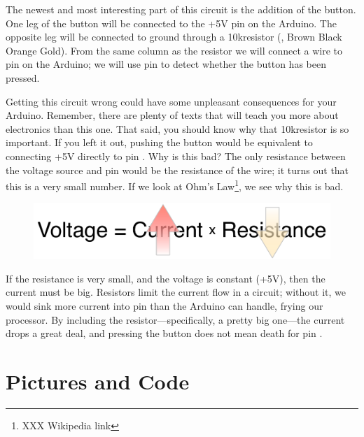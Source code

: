The newest and most interesting part of this circuit is the addition of the button. One leg of the button will be connected to the {\code +5V} pin on the Arduino. The opposite leg will be connected to ground through a 10k\ohm resistor (, Brown Black Orange Gold). From the same column as the resistor we will connect a wire to pin \pintwo on the Arduino; we will use pin \pintwo to detect whether the button has been pressed. 

Getting this circuit wrong could have some unpleasant consequences for your Arduino. Remember, there are plenty of texts that will teach you more about electronics than this one. That said, you should know why that 10k\ohm resistor is so important. If you left it out, pushing the button would be equivalent to connecting {\code +5V} directly to pin \pintwo. Why is this bad? The only resistance between the voltage source and pin \pintwo would be the resistance of the wire; it turns out that this is a very small number. If we look at Ohm's Law\footnote{XXX Wikipedia link}, we see why this is bad.


\begin{figure}[ht]
  \begin{center}
    \includegraphics[width=0.8\linewidth]{images/ch4-ohms-law}
    \label{image:ohms-law}
  \end{center}
\end{figure}

If the resistance is very small, and the voltage is constant ({\code +5V}), then the current must be big. Resistors limit the current flow in a circuit; without it, we would sink more current into pin \pintwo than the Arduino can handle, frying our processor. By including the resistor---specifically, a pretty big one---the current drops a great deal, and pressing the button does not mean death for pin \pintwo.

\newpage

\section{Pictures and Code}

